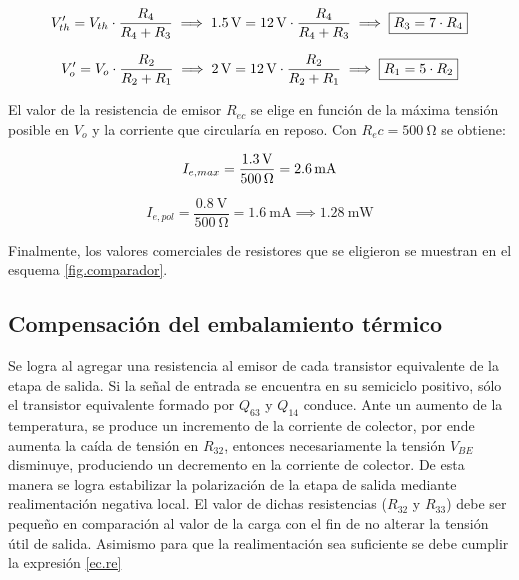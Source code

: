 \begin{equation}
	\centering
	V_{th}' = V_{th} \cdot \frac{R_4}{R_4 + R_3} \implies \SI{1.5}{\volt} = \SI{12}{\volt} \cdot \frac{R_4}{R_4 + R_3} \implies \boxed{R_3 = 7 \cdot R_4}
\end{equation}

\begin{equation}
	\centering
	V_o' = V_o \cdot \frac{R_2}{R_2 + R_1} \implies \SI{2}{\volt} = \SI{12}{\volt} \cdot \frac{R_2}{R_2 + R_1} \implies \boxed{R_1 = 5 \cdot R_2}
	\end{equation}

	El valor de la resistencia de emisor $R_{ec}$ se elige en función de la máxima tensión posible en $V_o$ y la corriente que circularía en reposo. Con $R_ec = \SI{500}{\ohm}$ se obtiene:

	\begin{equation}
		\centering
		I_{e,max} = \frac{ \SI{1.3}{\volt} }{ \SI{500}{\ohm} } = \SI{2.6}{\milli\ampere}
	\end{equation}

	\begin{equation}
		I_{e,pol} = \frac{ \SI{0.8}{\volt} }{ \SI{500}{\ohm} } = \SI{1.6}{\milli\ampere} \implies \SI{1.28}{\milli\watt}
	\end{equation}

Finalmente, los valores comerciales de resistores que se eligieron se muestran en el esquema \ref{fig.comparador}.	
	
\subsection{Compensación del embalamiento térmico}

	Se logra al agregar una resistencia al emisor de cada transistor equivalente de la etapa de salida. Si la señal de entrada se encuentra en su semiciclo positivo, sólo el transistor equivalente formado por $Q_{63}$ y $Q_{14}$ conduce. Ante un aumento de la temperatura, se produce un incremento de la corriente de colector, por ende aumenta la caída de tensión en $R_{32}$, entonces necesariamente la tensión $V_{BE}$ disminuye, produciendo un decremento en la corriente de colector. De esta manera se logra estabilizar la polarización de la etapa de salida mediante realimentación negativa local. El valor de dichas resistencias ($R_{32}$ y $R_{33}$) debe ser pequeño en comparación al valor de la carga con el fin de no alterar la tensión útil de salida. Asimismo para que la realimentación sea suficiente se debe cumplir la expresión \eqref{ec.re}

